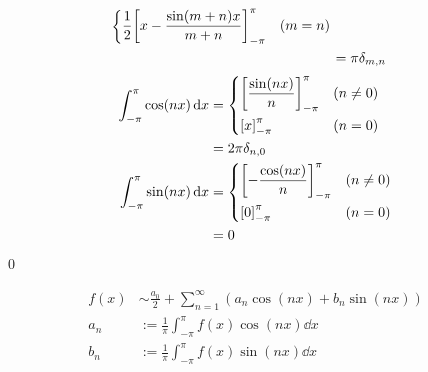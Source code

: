 \documentclass[uplatex,dvipdfmx,a4paper,11pt]{jlreq}
\makeatletter
\theoremstyle{definition}
\renewenvironment{proof}[1][\proofname]{\par
  \normalfont
  \topsep6\p@\@plus6\p@ \trivlist
  \item[\hskip\labelsep{\bfseries #1}\@addpunct{\bfseries}]\ignorespaces\quad\par
}{%
  \qed\endtrivlist\@endpefalse
}
\renewcommand\proofname{証明}
\makeatother
\begin{document}
\begin{proof}
\begin{align}
\begin{dcases}
                                                 \frac{1}{2}\qty[x - \frac{\sin(m + n)x}{m + n}]_{-\pi}^\pi                          & (m = n)
                                               \end{dcases} \\
                                           & = \pi\delta_{m,n}
  \end{align}
  \begin{align}
    \int_{-\pi}^\pi \cos(nx)\dd{x} & = \begin{dcases}
                                         \qty[\frac{\sin(nx)}{n}]_{-\pi}^\pi & (n \neq 0) \\
                                         \qty[x]_{-\pi}^\pi                  & (n = 0)
                                       \end{dcases}  \\
                                   & = 2\pi\delta_{n,0}                                       \\
    \int_{-\pi}^\pi \sin(nx)\dd{x} & = \begin{dcases}
                                         \qty[-\frac{\cos(nx)}{n}]_{-\pi}^\pi & (n \neq 0) \\
                                         \qty[0]_{-\pi}^\pi                   & (n = 0)
                                       \end{dcases} \\
                                   & = 0
  \end{align}
\end{proof}

\begin{definition}[$2\pi$ の周期をもつ関数のフーリエ級数]
  \begin{align}
    f(x) & \sim \frac{a_0}{2} + \sum_{n=1}^{\infty}(a_n\cos(nx) + b_n\sin(nx)) \\
    a_n  & := \frac{1}{\pi}\int_{-\pi}^\pi f(x)\cos(nx)\dd{x}                  \\
    b_n  & := \frac{1}{\pi}\int_{-\pi}^\pi f(x)\sin(nx)\dd{x}
  \end{align}
\end{definition}
\end{document}
